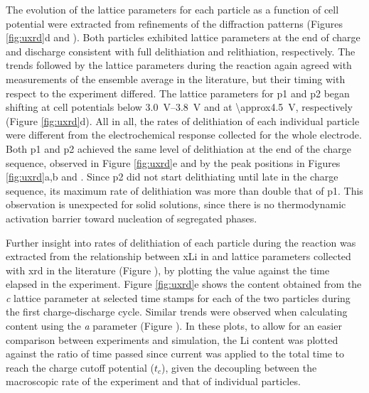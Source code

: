 \documentclass{article}
\begin{document}
The evolution of the lattice parameters for each particle as a
function of cell potential were extracted from refinements of the
diffraction patterns (Figures \ref{fig:uxrd}d and
). Both particles exhibited lattice parameters
at the end of charge and discharge consistent with full delithiation
and relithiation, respectively\cite{novak2015}. The trends followed by
the lattice parameters during the reaction again agreed with
measurements of the ensemble average in the literature\cite{novak2015,
  faenza2018}, but their timing with respect to the experiment
differed. The lattice parameters for \gls{p1} and \gls{p2} began
shifting at cell potentials below \SIrange{3.0}{3.8}{\volt} and at
\SI{\approx4.5}{\volt}, respectively (Figure \ref{fig:uxrd}d). All in
all, the rates of delithiation of each individual particle were
different from the electrochemical response collected for the whole
electrode. Both \gls{p1} and \gls{p2} achieved the same level of
delithiation at the end of the charge sequence, observed in Figure
\ref{fig:uxrd}e and by the peak positions in Figures \ref{fig:uxrd}a,b
and . Since \gls{p2} did not start delithiating
until late in the charge sequence, its maximum rate of delithiation
was more than double that of \gls{p1}. This observation is unexpected
for solid solutions, since there is no thermodynamic activation
barrier toward nucleation of segregated phases.


\newpage %
Further insight into rates of delithiation of each particle during the
reaction was extracted from the relationship between \gls{xLi} in
 and lattice parameters collected with \gls{xrd} in the
literature\cite{robert2015} (Figure ), by
plotting the value against the time elapsed in the experiment. Figure
\ref{fig:uxrd}e shows the  content obtained from the \emph{c}
lattice parameter at selected time stamps for each of the two 
particles during the first charge-discharge cycle. Similar trends were
observed when calculating  content using the \emph{a} parameter
(Figure ). In these plots, to allow for an easier
comparison between experiments and simulation, the Li content was
plotted against the ratio of time passed since current was applied to
the total time to reach the charge cutoff potential ($t_c$), given the
decoupling between the macroscopic rate of the experiment and that of
individual particles.
\end{document}
